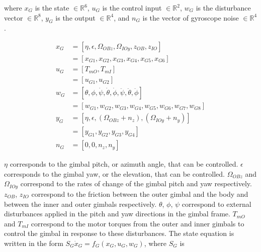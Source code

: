 \documentclass[letterpaper, 10 pt, conference]{ieeeconf}  %
\begin{document}
where $x_G$ is the state $\in \mathbb{R}^{6}$, $u_G$ is the control input $\in \mathbb{R}^{2}$,
$w_G$ is the disturbance vector $\in \mathbb{R}^{8}$, $y_G$ is the output $\in \mathbb{R}^{4}$,
and $n_G$ is the vector of gyroscope noise $\in \mathbb{R}^{4}$. 

\begin{equation}
  \label{sample:states_and_shit}
  \begin{aligned}
    x_G & = [\eta, \epsilon, \Omega_{OBz}, \Omega_{IOy}, z_{OB}, z_{IO}]                                  \\
        & = [x_{G1}, x_{G2}, x_{G3}, x_{G4}, x_{G5}, x_{G6}]                                              \\
    u_G & = [T_{mO}, T_{mI}]                                                                              \\
        & = [u_{G1}, u_{G2}]                                                                              \\
    w_G & = [\theta, \phi, \dot{\psi}, \dot{\theta}, \dot{\phi}, \ddot{\psi}, \ddot{\theta}, \ddot{\phi}] \\
        & = [w_{G1}, w_{G2}, w_{G3}, w_{G4}, w_{G5}, w_{G6}, w_{G7}, w_{G8}]                              \\
    y_G & = [\eta, \epsilon, (\Omega_{OBz} + n_z), (\Omega_{IOy} + n_y)]                                  \\
        & = [y_{G1}, y_{G2}, y_{G3}, y_{G4}]                                                              \\
    n_G & = [0, 0, n_z, n_y]
  \end{aligned}
\end{equation}

$\eta$ corresponds to the gimbal pitch, or azimuth angle, that can be controlled.
$\epsilon$ corresponds to the gimbal yaw, or the elevation, that can be controlled.
$\Omega_{OBz}$ and $\Omega_{IOy}$ correspond to the rates of change of the gimbal pitch and yaw respectively.
$z_{OB}$, $z_{IO}$ correspond to the friction between the outer gimbal and the body and between the inner and outer gimbals respectively.
$\theta$, $\phi$, $\psi$ correspond to external disturbances applied in the pitch and yaw directions in the gimbal frame.
$T_{mO}$ and $T_{mI}$ correspond to the motor torques from the outer and inner gimbals to control the gimbal in response to these disturbances.
The state equation is written in the form $S_G \dot x_G = f_G(x_G, u_G, w_G)$, where $S_G$ is
\end{document}
